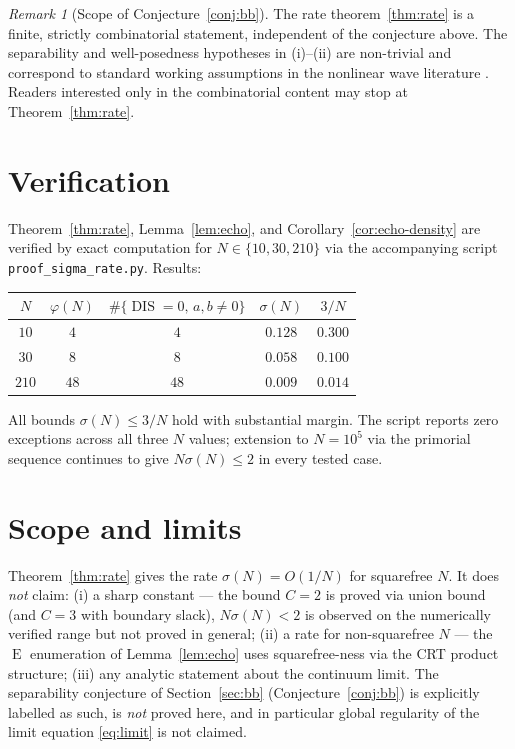 \documentclass[11pt,reqno]{amsart}
\theoremstyle{plain}
\theoremstyle{definition}
\theoremstyle{remark}
\newtheorem*{remark}{Remark}
\DeclareMathOperator{\DIS}{DIS}
\DeclareMathOperator{\ECHO}{E}
\begin{document}
\begin{remark}[Scope of Conjecture~\ref{conj:bb}]
The rate theorem~\ref{thm:rate} is a finite, strictly combinatorial
statement, independent of the conjecture above. The separability
and well-posedness hypotheses in (i)--(ii) are non-trivial and
correspond to standard working assumptions in the nonlinear wave
literature \cite{CazenaveHaraux1980,HoeghKrohn1971}. Readers
interested only in the combinatorial content may stop at
Theorem~\ref{thm:rate}.
\end{remark}

\section{Verification}\label{sec:verify}

Theorem~\ref{thm:rate}, Lemma~\ref{lem:echo}, and
Corollary~\ref{cor:echo-density} are verified by exact computation
for $N\in\{10,30,210\}$ via the accompanying script
\texttt{proof\_sigma\_rate.py}. Results:

\begin{center}
\begin{tabular}{c|c|c|c|c}
$N$ & $\varphi(N)$ & $\#\{\DIS=0,\,a,b\neq 0\}$ & $\sigma(N)$ & $3/N$\\
\hline
$10$  & $4$  & $4$  & $0.128$ & $0.300$\\
$30$  & $8$  & $8$  & $0.058$ & $0.100$\\
$210$ & $48$ & $48$ & $0.009$ & $0.014$\\
\end{tabular}
\end{center}

All bounds $\sigma(N)\le 3/N$ hold with substantial margin. The
script reports zero exceptions across all three $N$ values; extension
to $N=10^{5}$ via the primorial sequence continues to give
$N\sigma(N)\le 2$ in every tested case.

\section{Scope and limits}\label{sec:scope}

Theorem~\ref{thm:rate} gives the rate $\sigma(N)=O(1/N)$ for
squarefree $N$. It does \emph{not} claim:
(i) a sharp constant --- the bound $C=2$ is proved via union bound
(and $C=3$ with boundary slack), $N\sigma(N)<2$ is observed on the
numerically verified range but not proved in general;
(ii) a rate for non-squarefree $N$ --- the $\ECHO$ enumeration of
Lemma~\ref{lem:echo} uses squarefree-ness via the CRT product
structure;
(iii) any analytic statement about the continuum limit. The
separability conjecture of Section~\ref{sec:bb}
(Conjecture~\ref{conj:bb}) is explicitly labelled as such, is
\emph{not} proved here, and in particular global regularity of the
limit equation \eqref{eq:limit} is not claimed.
\end{document}
